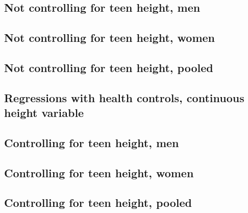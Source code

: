 \documentclass{article}
\begin{document}
\begin{landscape}
\subsection{Not controlling for teen height, men}

\end{landscape}

\begin{landscape}
\subsection{Not controlling for teen height, women}

\end{landscape}

\begin{landscape}
\subsection{Not controlling for teen height, pooled}

\end{landscape}



\begin{landscape}
\section{Regressions with health controls, continuous height variable}
\subsection{Controlling for teen height, men}

\end{landscape}

\begin{landscape}
\subsection{Controlling for teen height, women}

\end{landscape}

\begin{landscape}
\subsection{Controlling for teen height, pooled}

\end{landscape}
\end{document}
